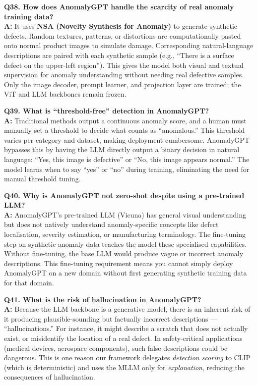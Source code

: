 \documentclass[12pt, a4paper]{article}
\begin{document}
\begin{qa}
\textbf{Q38. How does AnomalyGPT handle the scarcity of real anomaly training data?}\\[4pt]
\textbf{A:} It uses \textbf{NSA (Novelty Synthesis for Anomaly)} to generate synthetic defects. Random textures, patterns, or distortions are computationally pasted onto normal product images to simulate damage. Corresponding natural-language descriptions are paired with each synthetic sample (e.g., ``There is a surface defect on the upper-left region''). This gives the model both visual and textual supervision for anomaly understanding without needing real defective samples. Only the image decoder, prompt learner, and projection layer are trained; the ViT and LLM backbones remain frozen.
\end{qa}

\begin{qa}
\textbf{Q39. What is ``threshold-free'' detection in AnomalyGPT?}\\[4pt]
\textbf{A:} Traditional methods output a continuous anomaly score, and a human must manually set a threshold to decide what counts as ``anomalous.'' This threshold varies per category and dataset, making deployment cumbersome. AnomalyGPT bypasses this by having the LLM directly output a binary decision in natural language: ``Yes, this image is defective'' or ``No, this image appears normal.'' The model learns when to say ``yes'' or ``no'' during training, eliminating the need for manual threshold tuning.
\end{qa}

\begin{qa}
\textbf{Q40. Why is AnomalyGPT not zero-shot despite using a pre-trained LLM?}\\[4pt]
\textbf{A:} AnomalyGPT's pre-trained LLM (Vicuna) has general visual understanding but does not natively understand anomaly-specific concepts like defect localisation, severity estimation, or manufacturing terminology. The fine-tuning step on synthetic anomaly data teaches the model these specialised capabilities. Without fine-tuning, the base LLM would produce vague or incorrect anomaly descriptions. This fine-tuning requirement means you cannot simply deploy AnomalyGPT on a new domain without first generating synthetic training data for that domain.
\end{qa}

\begin{qa}
\textbf{Q41. What is the risk of hallucination in AnomalyGPT?}\\[4pt]
\textbf{A:} Because the LLM backbone is a generative model, there is an inherent risk of it producing plausible-sounding but factually incorrect descriptions --- ``hallucinations.'' For instance, it might describe a scratch that does not actually exist, or misidentify the location of a real defect. In safety-critical applications (medical devices, aerospace components), such false descriptions could be dangerous. This is one reason our framework delegates \textit{detection scoring} to CLIP (which is deterministic) and uses the MLLM only for \textit{explanation}, reducing the consequences of hallucination.
\end{qa}
\end{document}
